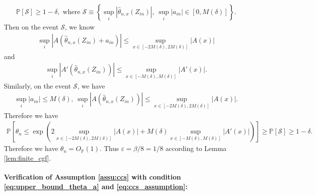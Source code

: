 \documentclass[12pt]{article}
\theoremstyle{definition}
\def\P{\mathbb{P}}
\def\P{\mathbb{P}}
\renewcommand{\P}{\mathbb{P}}							%
\newcommand{\srz}{Z}									%
\begin{document}
\begin{align*}
  \P\left[\mathcal{S}\right]\geq 1-\delta,\text{ where }\mathcal{S}\equiv\left\{\sup_{i}|\widehat{\theta}_{n,x}(\srz_{in})|,\ \sup_{i}|a_{in}|\in [0,M(\delta)]\right\}.
\end{align*}
Then on the event $\mathcal{S}$, we know 
\begin{align*}
  \sup_{i}|A(\widehat{\theta}_{n,x}(\srz_{in})+a_{in})|\leq \sup_{x\in [-2M(\delta),2M(\delta)]}|A(x)|
\end{align*}
and 
\begin{align*}
  \sup_{i}|A'(\widehat{\theta}_{n,x}(\srz_{in}))|\leq \sup_{x\in [-M(\delta),M(\delta)]}|A'(x)|.
\end{align*}
Similarly, on the event $\mathcal{S}$, we have 
\begin{align*}
  \sup_{i}|a_{in}|\leq M(\delta),\ \sup_{i}|A(\widehat{\theta}_{n,x}(\srz_{in}))|\leq \sup_{x\in [-2M(\delta),2M(\delta)]}|A(x)|.
\end{align*}
Therefore we have 
\begin{align*}
  \P\left[\theta_n\leq \exp\left(2\sup_{x\in [-2M(\delta),2M(\delta)]}|A(x)|+M(\delta)\sup_{x\in [-M(\delta),M(\delta)]}|A'(x)|\right)\right]\geq\P[\mathcal{S}]\geq 1-\delta.
\end{align*}
Therefore we have $\theta_n=O_{\P}(1)$. Thus $\varepsilon=\beta/8=1/8$ according to Lemma \ref{lem:finite_cgf}.

\paragraph{Verification of Assumption \ref{assu:ccs} with condition \eqref{eq:upper_bound_theta_a} and \eqref{eq:ccs_assumption}:}
\end{document}
